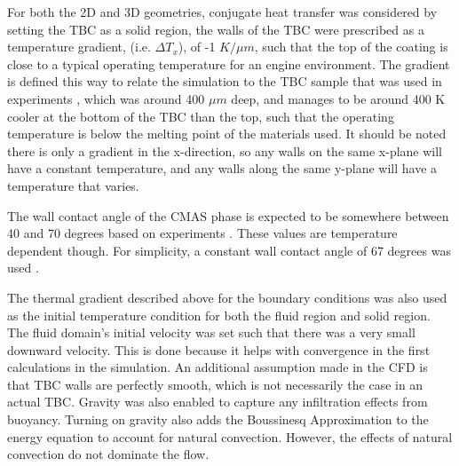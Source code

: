 \documentclass{UCF_ETD}
\begin{document}
For both the 2D and 3D geometries, conjugate heat transfer was considered by setting the TBC as a solid region, the walls of the TBC were prescribed as a temperature gradient, (i.e. $\Delta T_{x}$), of -1 $K/\mu m$, such that the top of the coating is close to a typical operating temperature for an engine environment. The gradient is defined this way to relate the simulation to the TBC sample that was used in experiments \cite{Naraparaju2019}, which was around 400 $\mu m$ deep, and manages to be around 400 K cooler at the bottom of the TBC than the top, such that the operating temperature is below the melting point of the materials used. It should be noted there is only a gradient in the x-direction, so any walls on the same x-plane will have a constant temperature, and any walls along the same y-plane will have a temperature that varies. 

The wall contact angle of the CMAS phase is expected to be somewhere between 40 and 70 degrees based on experiments \cite{Naraparaju2019}. 
These values are temperature dependent though. For simplicity, a constant wall contact angle of 67 degrees was used \cite{Naraparaju2019}.

The thermal gradient described above for the boundary conditions was also used as the initial temperature condition for both the fluid region and solid region. The fluid domain's initial velocity was set such that there was a very small downward velocity. This is done because it helps with convergence in the first calculations in the simulation.  An additional assumption made in the CFD is that TBC walls are perfectly smooth, which is not necessarily the case in an actual TBC.  Gravity was also enabled to capture any infiltration effects from buoyancy. Turning on gravity also adds the Boussinesq Approximation to the energy equation to account for natural convection. However, the effects of natural convection do not dominate the flow. 
\end{document}
